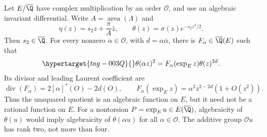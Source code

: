 \begin{proposition}\hypertarget{tag-001F}{}\label{ari:C.7.6}

Let $E/\overline{\Q}$ have complex multiplication by an order
$\mathcal O$, and use an algebraic invariant differential. Write
$A=\operatorname{area}(\Lambda)$ and
\[
 \eta(z)=s_2z+\frac{\pi}{A}\bar z,\qquad
 \theta(z)=\sigma(z)e^{-s_2z^2/2}.
\]
Then $s_2\in\overline{\Q}$. For every nonzero
$\alpha\in\mathcal O$, with $d=\alpha\bar\alpha$, there is
$F_\alpha\in\overline{\Q}(E)$ such that
\begin{equation}\hypertarget{tag-003Q}{}\label{ari:eq:ct-CMmult}
 \theta(\alpha z)^2=F_\alpha(\exp_E z)\theta(z)^{2d}.
\end{equation}
Its divisor and leading Laurent coefficient are
\[
 \operatorname{div}(F_\alpha)=2[\alpha]^*(O)-2d(O),\qquad
 F_\alpha(\exp_Ez)=\alpha^2z^{2-2d}(1+O(z^2)).
\]
Thus the unsquared quotient is an algebraic function on $E$, but
it need not be a rational function on $E$. For a nontorsion
$P=\exp_Eu\in E(\overline{\Q})$, algebraicity of $\theta(u)$
would imply algebraicity of $\theta(\alpha u)$ for all
$\alpha\in\mathcal O$. The additive group $\mathcal O u$ has
rank two, not more than four.
\end{proposition}


